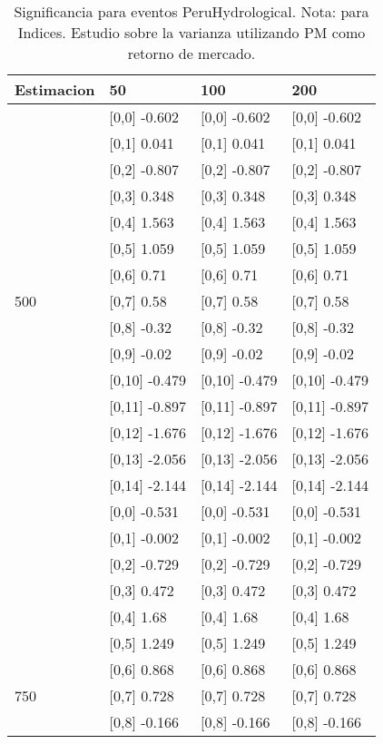 \begin{table}

\caption{Significancia para eventos PeruHydrological. Nota: para Indices. Estudio sobre la varianza utilizando PM como retorno de mercado.}
\centering
\begin{tabular}[t]{llll}
\toprule
Estimacion & 50 & 100 & 200\\
\midrule
 & {}[0,0] -0.602 & {}[0,0] -0.602 & {}[0,0] -0.602\\
 & {}[0,1] 0.041 & {}[0,1] 0.041 & {}[0,1] 0.041\\
 & {}[0,2] -0.807 & {}[0,2] -0.807 & {}[0,2] -0.807\\
 & {}[0,3] 0.348 & {}[0,3] 0.348 & {}[0,3] 0.348\\
 & {}[0,4] 1.563 & {}[0,4] 1.563 & {}[0,4] 1.563\\
\addlinespace
 & {}[0,5] 1.059 & {}[0,5] 1.059 & {}[0,5] 1.059\\
 & {}[0,6] 0.71 & {}[0,6] 0.71 & {}[0,6] 0.71\\
500 & {}[0,7] 0.58 & {}[0,7] 0.58 & {}[0,7] 0.58\\
 & {}[0,8] -0.32 & {}[0,8] -0.32 & {}[0,8] -0.32\\
 & {}[0,9] -0.02 & {}[0,9] -0.02 & {}[0,9] -0.02\\
\addlinespace
 & {}[0,10] -0.479 & {}[0,10] -0.479 & {}[0,10] -0.479\\
 & {}[0,11] -0.897 & {}[0,11] -0.897 & {}[0,11] -0.897\\
 & {}[0,12] -1.676 & {}[0,12] -1.676 & {}[0,12] -1.676\\
 & {}[0,13] -2.056 & {}[0,13] -2.056 & {}[0,13] -2.056\\
 & {}[0,14] -2.144 & {}[0,14] -2.144 & {}[0,14] -2.144\\
\addlinespace
 & {}[0,0] -0.531 & {}[0,0] -0.531 & {}[0,0] -0.531\\
 & {}[0,1] -0.002 & {}[0,1] -0.002 & {}[0,1] -0.002\\
 & {}[0,2] -0.729 & {}[0,2] -0.729 & {}[0,2] -0.729\\
 & {}[0,3] 0.472 & {}[0,3] 0.472 & {}[0,3] 0.472\\
 & {}[0,4] 1.68 & {}[0,4] 1.68 & {}[0,4] 1.68\\
\addlinespace
 & {}[0,5] 1.249 & {}[0,5] 1.249 & {}[0,5] 1.249\\
 & {}[0,6] 0.868 & {}[0,6] 0.868 & {}[0,6] 0.868\\
750 & {}[0,7] 0.728 & {}[0,7] 0.728 & {}[0,7] 0.728\\
 & {}[0,8] -0.166 & {}[0,8] -0.166 & {}[0,8] -0.166\\

\end{tabular}
\end{table}

